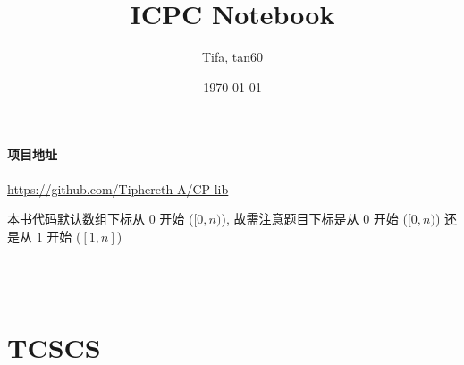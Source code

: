 \documentclass{ICPCnotebook}
\title{\vspace{-4ex}\Large{ICPC Notebook}}
\author{Tifa, tan60}
\date{\today}
\begin{document}
    \maketitle

    \pagestyle{plain}

	\setcounter{page}{1}

    \paragraph{项目地址} \url{https://github.com/Tiphereth-A/CP-lib}

    本书代码默认数组下标从 \(0\) 开始 (\([0, n)\)), 故需注意题目下标是从 \(0\) 开始 (\([0, n)\)) 还是从 \(1\) 开始 (\([1, n]\))

    \inputminted{cpp}{src/src/main.cpp}

    \inputminted{cpp}{src/src/test.cpp}
    
    \inputminted{yaml}{src/src/.clang-format}

    \inputminted{bash}{src/src/run.sh}

    \newpage
    \begin{multicols}{2}
        \tableofcontents
    \end{multicols}

    \newpage
	\pagestyle{fancy}
	\setcounter{page}{1}

    
    

    \section{TCSCS}
    \label{sec:theoretical-computer-science-cheat-sheet}

    
    
    
    
\end{document}

